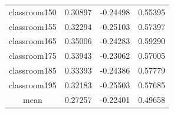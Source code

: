 \documentclass[cic,tc]{iiufrgs}
\begin{document}
\begin{table}[h]
\begin{tabular}{c|c|c|c}
          classroom150 & 0.30897 & -0.24498 & 0.55395 \\
          classroom155 & 0.32294 & -0.25103 & 0.57397 \\
          classroom165 & 0.35006 & -0.24283 & 0.59290 \\
          classroom175 & 0.33943 & -0.23062 & 0.57005 \\
          classroom185 & 0.33393 & -0.24386 & 0.57779 \\
          classroom195 & 0.32183 & -0.25503 & 0.57685 \\
          \hline
          \hline
          mean & 0.27257 & -0.22401 & 0.49658 \\
          \hline
        \end{tabular}
    \label{tbl:results1}
\end{table}
\end{document}
